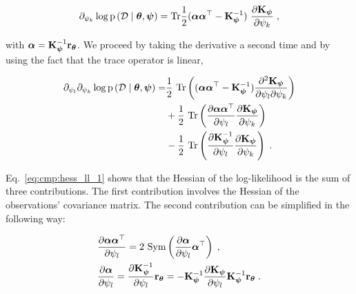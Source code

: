 \begin{equation}
     \partial_{\psi_k} \log \mathrm{p} \left( \mathcal{D} \mid \boldsymbol{\theta}, \boldsymbol{\psi} \right) = \mathrm{Tr}{\dfrac{1}{2} (\boldsymbol{\alpha} \boldsymbol{\alpha}^{\top} - \mathbf{K}_{\boldsymbol{\psi}}^{-1}) \  \dfrac{\partial \mathbf{K}_{\boldsymbol{\psi}}}{\partial \psi_k}} \; ,
     \label{eq:cmp:ll_gradient}
\end{equation}

with $\boldsymbol{\alpha} = \mathbf{K}_{\boldsymbol{\psi}}^{-1} \mathbf{r}_{\boldsymbol{\theta}}$. We proceed by taking the derivative a second time and by using the fact that the trace operator is linear,

\begin{equation}
\left.
    \begin{aligned}
        \partial_{\psi_l} \partial_{\psi_k} \log \mathrm{p} \left( \mathcal{D} \mid \boldsymbol{\theta}, \boldsymbol{\psi} \right)  = & \dfrac{1}{2} \ \mathrm{Tr}\left((\boldsymbol{\alpha} \boldsymbol{\alpha}^{\top} - \mathbf{K}^{-1}_{\boldsymbol{\psi}})\dfrac{\partial^2 \mathbf{K}_{\boldsymbol{\psi}}}{\partial \psi_l \partial \psi_k}\right)  \\
        & + \dfrac{1}{2}\ \mathrm{Tr}\left(\dfrac{\partial \boldsymbol{\alpha} \boldsymbol{\alpha}^{\top}}{\partial \psi_l} \dfrac{\partial \mathbf{K}_{\boldsymbol{\psi}}}{\partial \psi_k} \right) \\
        & - \dfrac{1}{2}\ \mathrm{Tr} \left(\dfrac{\partial \mathbf{K}_{\boldsymbol{\psi}}^{-1}}{\partial \psi_l} \dfrac{\partial \mathbf{K}_{\boldsymbol{\psi}}}{\partial \psi_k}\right) \;.
    \end{aligned}
\right.
\label{eq:cmp:hess_ll_1}
\end{equation}

Eq.~\eqref{eq:cmp:hess_ll_1} shows that the Hessian of the log-likelihood is the sum of three contributions. 
The first contribution involves the Hessian of the observations' covariance matrix. The second contribution can be simplified in the following way: 

\begin{equation}
    \left.
    \begin{aligned}
            & \dfrac{\partial \boldsymbol{\alpha} \boldsymbol{\alpha}^{\top}}{\partial \psi_l} = 2 \ \text{Sym} \left( \dfrac{\partial \boldsymbol{\alpha}}{\partial \psi_l} \boldsymbol{\alpha}^{\top} \right) \; , \\
            & \frac{\partial \boldsymbol{\alpha}}{\partial \psi_l}  = \frac{\partial \mathbf{K}_{\boldsymbol{\psi}}^{-1}}{\partial \psi_l} \mathbf{r}_{\boldsymbol{\theta}} = -\mathbf{K}_{\boldsymbol{\psi}}^{-1} \dfrac{\partial \mathbf{K}_{\boldsymbol{\psi}}}{\partial \psi_l} \mathbf{K}_{\boldsymbol{\psi}}^{-1} \mathbf{r}_{\boldsymbol{\theta}} \; .
    \end{aligned}
    \right.
    \label{eq:cmp:hess_ll_2}
\end{equation}

